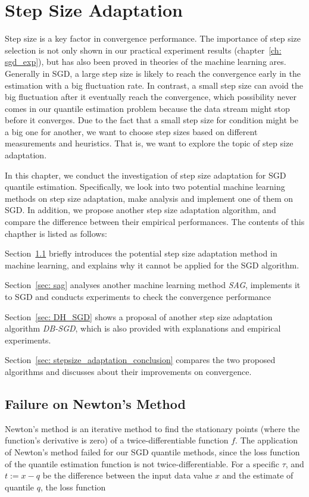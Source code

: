 \chapter{Step Size Adaptation}
\label{ch: stepsize_adaptation}

\graphicspath{{Figures/Stepsize_adapt/}{./}} 

Step size is a key factor in convergence performance. The importance of step size selection is not only shown in our practical experiment results (chapter~\ref{ch: sgd_exp}), but has also been proved in theories of the machine learning ares. Generally in SGD, a large  step size is likely to reach the convergence early in the estimation with a big fluctuation rate. In contrast, a small step size can avoid the big fluctuation after it eventually reach the convergence, which possibility never comes in our quantile estimation problem because the data stream might stop before it converges.
Due to the fact that a small step size for condition might be a big one for another, we want to choose step sizes based on different measurements and heuristics. That is, we want to explore the topic of step size adaptation. 

In this chapter, we conduct the investigation of step size adaptation for SGD quantile estimation. Specifically, we look into two potential machine learning methods on step size adaptation, make analysis and implement one of them on SGD. In addition, we propose another step size adaptation algorithm, and compare the difference between their empirical performances. The contents of this chapther is listed as follows:

Section~\ref{sec: newton} briefly introduces the potential step size adaptation method in machine learning, and explains why it cannot be applied for the SGD algorithm.

Section~\ref{sec: sag} analyses another machine learning method \textit{SAG}, implements it to SGD and conducts experiments to check the convergence performance

Section~\ref{sec: DH_SGD} shows a proposal of another step size adaptation algorithm \textit{DB-SGD}, which is also provided with explanations and empirical experiments.

Section~\ref{sec: stepsize_adaptation_conclusion} compares the two proposed algorithms and discusses about their improvements on convergence.

\section{Failure on Newton's Method}
\label{sec: newton}
Newton's method is an iterative method to find the stationary points (where the function's derivative is zero) of a twice-differentiable function $f$. The application of Newton's method failed for our SGD quantile methods, since the loss function of the quantile estimation function is not twice-differentiable. For a specific $\tau$, and $t := x - q$ be the difference between the input data value $x$ and the estimate of quantile $q$, the loss function 

